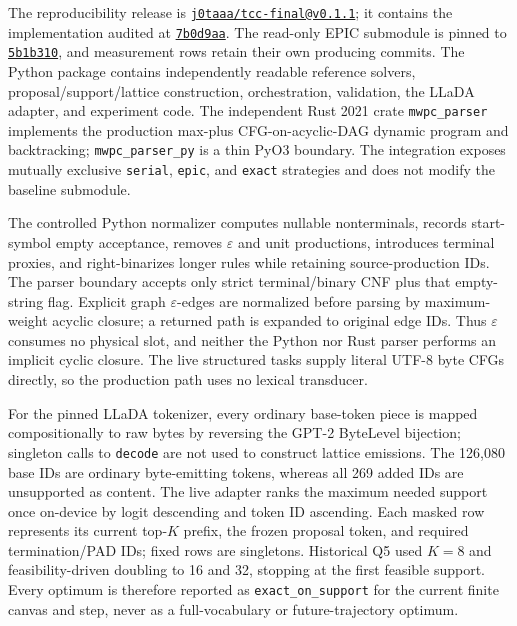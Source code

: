 The reproducibility release is \href{https://github.com/j0taaa/tcc-final/tree/v0.1.1}{\texttt{j0taaa/tcc-final@v0.1.1}}; it contains the implementation audited at \href{https://github.com/j0taaa/tcc-final/commit/7b0d9aabeeaa3388b4b652b9e24d66f0da9b784d}{\texttt{7b0d9aa}}. The read-only EPIC submodule is pinned to \href{https://github.com/hyundong98/EPIC-Decoding/commit/5b1b31098f34ed3691d2a9f4aae14fdf5839d072}{\texttt{5b1b310}}, and measurement rows retain their own producing commits. The Python package contains independently readable reference solvers, proposal/support/lattice construction, orchestration, validation, the LLaDA adapter, and experiment code. The independent Rust 2021 crate \texttt{mwpc\_parser} implements the production max-plus CFG-on-acyclic-DAG dynamic program and backtracking; \texttt{mwpc\_parser\_py} is a thin PyO3 boundary. The integration exposes mutually exclusive \texttt{serial}, \texttt{epic}, and \texttt{exact} strategies and does not modify the baseline submodule.

The controlled Python normalizer computes nullable nonterminals, records start-symbol empty acceptance, removes $\varepsilon$ and unit productions, introduces terminal proxies, and right-binarizes longer rules while retaining source-production IDs. The parser boundary accepts only strict terminal/binary CNF plus that empty-string flag. Explicit graph $\varepsilon$-edges are normalized before parsing by maximum-weight acyclic closure; a returned path is expanded to original edge IDs. Thus $\varepsilon$ consumes no physical slot, and neither the Python nor Rust parser performs an implicit cyclic closure. The live structured tasks supply literal UTF-8 byte CFGs directly, so the production path uses no lexical transducer.

For the pinned LLaDA tokenizer, every ordinary base-token piece is mapped compositionally to raw bytes by reversing the GPT-2 ByteLevel bijection; singleton calls to \texttt{decode} are not used to construct lattice emissions. The 126,080 base IDs are ordinary byte-emitting tokens, whereas all 269 added IDs are unsupported as content. The live adapter ranks the maximum needed support once on-device by logit descending and token ID ascending. Each masked row represents its current top-$K$ prefix, the frozen proposal token, and required termination/PAD IDs; fixed rows are singletons. Historical Q5 used $K=8$ and feasibility-driven doubling to 16 and 32, stopping at the first feasible support. Every optimum is therefore reported as \texttt{exact\_on\_support} for the current finite canvas and step, never as a full-vocabulary or future-trajectory optimum.

